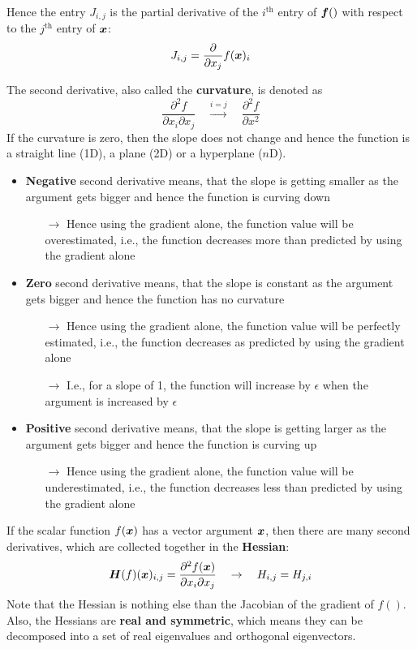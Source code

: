 \begin{multicols}{2}
	Hence the entry $J_{i,j}$ is the partial derivative of the $i^{\text{th}}$ entry of $\bol{f}()$ with respect to the $j^{\text{th}}$ entry of $\bol{x}$:
	\[ J_{i,j} = \frac{\partial}{\partial x_j} f(\bol{x})_i \]

	The second derivative, also called the \textbf{curvature}, is denoted as
	\[ \frac{\partial^2 f}{\partial x_i \partial x_j} \quad\overset{i=j}{\rightarrow}\quad
	\frac{\partial^2 f}{\partial x^2} \]
	If the curvature is zero, then the slope does not change and hence the function is a straight line (1D), a plane (2D) or a hyperplane ($n$D).
	\begin{itemize}
		\item \textbf{Negative} second derivative means, that the slope is getting smaller as the argument gets bigger and hence the function is curving down
		\begin{itemize}
			\item[$\rightarrow$] Hence using the gradient alone, the function value will be overestimated, i.e., the function decreases more than predicted by using the gradient alone
		\end{itemize}
		\item \textbf{Zero} second derivative means, that the slope is constant as the argument gets bigger and hence the function has no curvature
		\begin{itemize}
			\item[$\rightarrow$] Hence using the gradient alone, the function value will be perfectly estimated, i.e., the function decreases as predicted by using the gradient alone
			\item[$\rightarrow$] I.e., for a slope of 1, the function will increase by $\epsilon$ when the argument is increased by $\epsilon$
		\end{itemize}
		\item \textbf{Positive} second derivative means, that the slope is getting larger as the argument gets bigger and hence the function is curving up
		\begin{itemize}
			\item[$\rightarrow$] Hence using the gradient alone, the function value will be underestimated, i.e., the function decreases less than predicted by using the gradient alone
		\end{itemize}
	\end{itemize}

	If the scalar function $f(\bol{x})$ has a vector argument $\bol{x}$, then there are many second derivatives, which are collected together in the \textbf{Hessian}:
	\[ \bol{H}(f)(\bol{x})_{i,j} = \frac{\partial^2 f(\bol{x})}{\partial x_i\partial x_j}
	\quad\rightarrow\quad H_{i,j}=H_{j,i} \]
	Note that the Hessian is nothing else than the Jacobian of the gradient of $f()$.
	Also, the Hessians are \textbf{real and symmetric}, which means they can be decomposed into a set of real eigenvalues and orthogonal eigenvectors.\\


\end{multicols}
